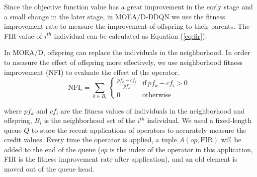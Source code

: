 \documentclass[journal]{IEEEtran}
\newcommand{\TODO}[1]{\textcolor[rgb]{1.00,0.40,0.22}{#1}}
\begin{document}
Since the objective function value has a great improvement in the early stage and a small change in the later stage, in MOEA/D-DDQN we use the fitness improvement rate to measure the improvement of offspring to their parents.
The FIR value of $i^{th}$ individual can be calculated as Equation (\ref{eq:fir}).


In MOEA/D, offspring can replace the individuals in the neighborhood. In order to measure the effect of offspring more effectively, we use neighborhood fitness improvement (NFI) to evaluate the effect of the operator.
\begin{equation}
  \text{NFI}_{i}= \sum_{k \in B_i}
  \left\{
  \begin{array}{ll}
    \frac{pf_{k}-cf_{i}}{pf_{k}} & \text{if}\ pf_{k}-cf_{i}>0 \\

    0                            & \text{otherwise}
  \end{array}
  \right.
  \label{eq:nfi}
\end{equation}

where $pf_{k}$ and $cf_{i}$ are the fitness values of individuals in the neighborhood and offspring, $B_i$ is the neighborhood set of the $i^{th}$ individual.
% 
We used a fixed-length queue $Q$ to store the recent applications of operators to accurately measure the credit values.
Every time the operator is applied, a tuple $A (op, \text{FIR})$ will be added to the end of the queue ($op$ is the index of the operator in this application, FIR is the fitness improvement rate after application), and an old element is moved out of the queue head.
\end{document}
